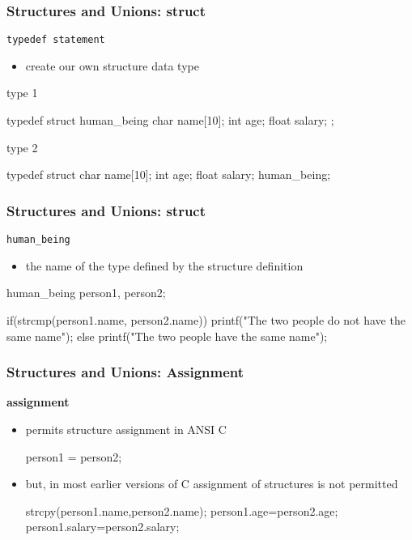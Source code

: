 \documentclass[newPxFont,sthlmFooter,nooffset]{beamer}
\begin{document}
\begin{frame}[t, fragile]
  \frametitle{Structures and Unions: struct}
\texttt{typedef statement}
\begin{itemize}
\item create our own structure data type
\end{itemize}

type 1
\begin{codedef}
typedef struct human_being { 
    char name[10];
    int age;
    float salary;
};
\end{codedef}

type 2
\begin{codedef}
typedef struct { 
    char name[10]; 
    int age;
    float salary;
} human_being;
\end{codedef}
\end{frame}


\begin{frame}[t, fragile]
  \frametitle{Structures and Unions: struct}
\texttt{human\_being}  
\begin{itemize}
\item the name of the type defined by the structure definition
\end{itemize}

\begin{codedef}
human_being person1, person2;

if(strcmp(person1.name, person2.name)) 
    printf("The two people do not have the same name\n");
else
    printf("The two people have the same name\n");
\end{codedef}
\end{frame}


\begin{frame}[t, fragile]
  \frametitle{Structures and Unions: Assignment}
\textbf{assignment}
\begin{itemize}
\item permits structure assignment in ANSI C

\begin{codedef}
  person1 = person2;
\end{codedef}
\item but, in most earlier versions of C assignment of structures is not permitted
\begin{codedef}
   strcpy(person1.name,person2.name); 
   person1.age=person2.age; 
   person1.salary=person2.salary;    
\end{codedef}
\end{itemize}
\end{frame}
\end{document}

